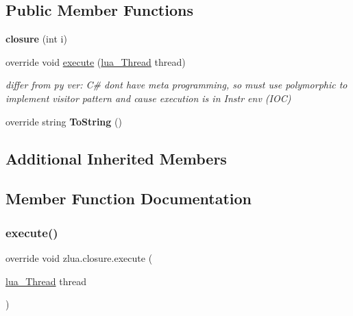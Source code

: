 \subsection*{Public Member Functions}
\begin{DoxyCompactItemize}
\item 
\mbox{\label{classzlua_1_1closure_a42b516f075f4b4ce19e591d6102ca06c}} 
{\bfseries closure} (int i)
\item 
override void \mbox{\hyperlink{classzlua_1_1closure_aa569159f1b1106362a86951524e96bce}{execute}} (\mbox{\hyperlink{classzlua_1_1lua___thread}{lua\+\_\+\+Thread}} thread)
\begin{DoxyCompactList}\small\item\em differ from py ver\+: C\# dont have meta programming, so must use polymorphic to implement visitor pattern and cause execution is in Instr env (I\+OC) \end{DoxyCompactList}\item 
\mbox{\label{classzlua_1_1closure_a5ba32eccf1c70376f32ee6ca4bbe9424}} 
override string {\bfseries To\+String} ()
\end{DoxyCompactItemize}
\subsection*{Additional Inherited Members}


\subsection{Member Function Documentation}
\mbox{\label{classzlua_1_1closure_aa569159f1b1106362a86951524e96bce}} 
\subsubsection{\texorpdfstring{execute()}{execute()}}
{\footnotesize\ttfamily override void zlua.\+closure.\+execute (\begin{DoxyParamCaption}\item[{\mbox{\hyperlink{classzlua_1_1lua___thread}{lua\+\_\+\+Thread}}}]{thread }\end{DoxyParamCaption})\hspace{0.3cm}{\ttfamily [virtual]}}



